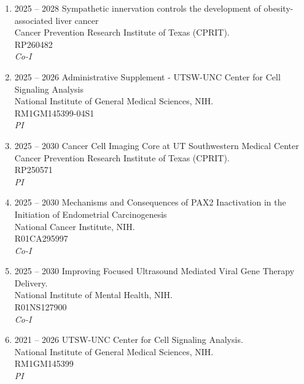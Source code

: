 \begin{enumerate}
[leftmargin=!,
labelindent=0pt,
itemindent=-66pt,
label=\textbullet]

\item 2025 -- 2028 
\hspace{8pt}
Sympathetic innervation controls the development of obesity-associated liver cancer \\
Cancer Prevention Research Institute of Texas (CPRIT). \\
RP260482 \\
{\it Co-I} \\ 

\item 2025 -- 2026 
\hspace{8pt}
Administrative Supplement - UTSW-UNC Center for Cell Signaling Analysis \\
National Institute of General Medical Sciences, NIH. \\
RM1GM145399-04S1 \\ 
{\it PI}

\item 2025 -- 2030 
\hspace{8pt}
Cancer Cell Imaging Core at UT Southwestern Medical Center \\
Cancer Prevention Research Institute of Texas (CPRIT). \\
RP250571 \\ 
{\it PI}


\item 2025 -- 2030 
\hspace{8pt}
Mechanisms and Consequences of PAX2 Inactivation in the Initiation of Endometrial Carcinogenesis \\
National Cancer Institute, NIH. \\
R01CA295997 \\ 
{\it Co-I} \\ 

\item 2025 -- 2030 
\hspace{8pt}
Improving Focused Ultrasound Mediated Viral Gene Therapy Delivery. \\
National Institute of Mental Health, NIH. \\
R01NS127900 \\
{\it Co-I} \\ 

\item 2021 -- 2026 
\hspace{8pt}
UTSW-UNC Center for Cell Signaling Analysis. \\
National Institute of General Medical Sciences, NIH. \\
RM1GM145399 \\ 
{\it PI}


\end{enumerate}
